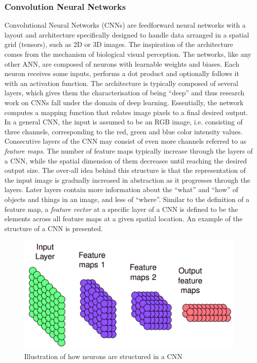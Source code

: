         \subsubsection{Convolution Neural Networks}
            Convolutional Neural Networks (CNNs) are feedforward neural networks with a
            layout and architecture specifically designed to handle data arranged in a spatial
            grid (tensors), such as 2D or 3D images. The inspiration of the architecture comes
            from the mechanism of biological visual perception. The networks, like any other
            ANN, are composed of neurons with learnable weights and biases. Each neuron
            receives some inputs, performs a dot product and optionally follows it with an
            activation function. The architecture is typically composed of several layers, which
            gives them the characterisation of being “deep” and thus research work on CNNs fall
            under the domain of deep learning. Essentially, the network computes a mapping
            function that relates image pixels to a final desired output. \\ 
            \vspace{3mm}
            In a general CNN, the input is assumed to be an RGB image, i.e. consisting of
            three channels, corresponding to the red, green and blue color intensity values.
            Consecutive layers of the CNN may consist of even more channels referred to as
            \emph{feature maps}. The number of feature maps typically increase through the layers of
            a CNN, while the spatial dimension of them decreases until reaching the desired
            output size. The over-all idea behind this structure is that the representation of the
            input image is gradually increased in abstraction as it progresses through the layers.
            Later layers contain more information about the “what” and “how” of objects and
            things in an image, and less of “where”. Similar to the definition of a feature map,
            a \emph{feature vector} at a specific layer of a CNN is defined to be the elements across all
            feature maps at a given spatial location. An example of the structure of a CNN is
            presented. 
            \begin{figure}[H]
                \centering
                \includegraphics[width=0.6\linewidth]{img/illustration.png}
                \caption{Illustration of how neurons are structured in a CNN}
            \end{figure}

